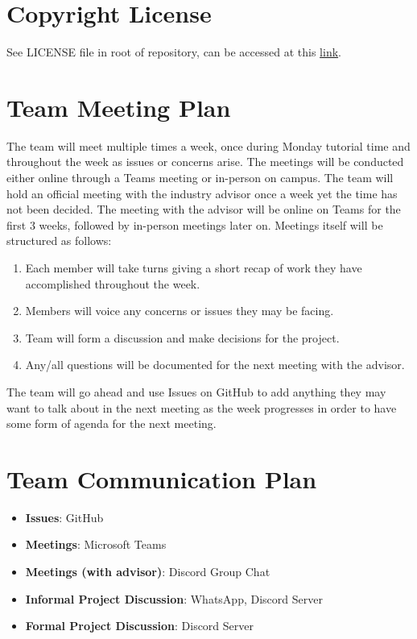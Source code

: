 \documentclass{article}
\begin{document}
\section{Copyright License}

See LICENSE file in root of repository, can be accessed at this \href{https://github.com/ssm-lab/capstone--source-code-optimizer/blob/main/LICENSE}{link}.

\section{Team Meeting Plan}

\hspace{\parindent} The team will meet multiple times a week, once during Monday tutorial time and throughout the week as issues or concerns arise. The meetings will be conducted either online through a Teams meeting or in-person on campus. The team
will hold an official meeting with the industry advisor once a week yet the time has not been decided. The meeting with the advisor will be online on Teams for the first 3 weeks, followed by in-person meetings later on. Meetings itself will be structured as follows:
\begin{enumerate}
  \item Each member will take turns giving a short recap of work they have accomplished throughout the week.
  \item Members will voice any concerns or issues they may be facing.
  \item Team will form a discussion and make decisions for the project.
  \item Any/all questions will be documented for the next meeting with the advisor.
\end{enumerate}
The team will go ahead and use Issues on GitHub to add anything they may want to talk about in the next meeting as the week progresses in order to have some form of agenda for the next meeting.

\section{Team Communication Plan}

\begin{itemize}

    \item \textbf{Issues}: GitHub 
    \item \textbf{Meetings}: Microsoft Teams 
    \item \textbf{Meetings (with advisor)}: Discord Group Chat
    \item \textbf{Informal Project Discussion}: WhatsApp, Discord Server
    \item \textbf{Formal Project Discussion}: Discord Server
    
\end{itemize}
\end{document}
